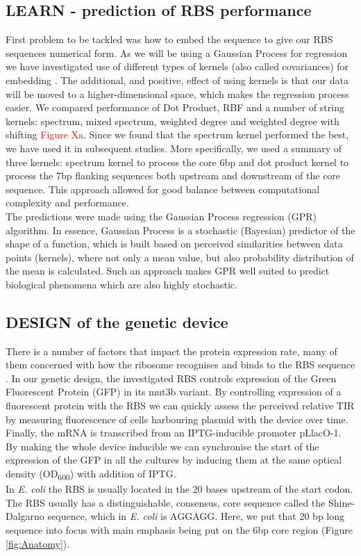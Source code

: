 \documentclass{article}
\begin{document}
\subsection{LEARN - prediction of RBS performance}
First problem to be tackled was how to embed the sequence to give our RBS sequences numerical form. As we will be using a Gaussian Process for regression we have investigated use of different types of kernels (also called covariances) for embedding \cite{Ben-Hur2008}. 
The additional, and positive, effect of using kernels is that our data will be moved to a higher-dimensional space, which makes the regression process easier. 
We compared performance of Dot Product, RBF and a number of string kernels: spectrum, mixed spectrum, weighted degree and weighted degree with shifting \textcolor{red}{Figure Xa}. 
Since we found that the spectrum kernel performed the best, we have used it in subsequent studies. More specifically, we used a summary of three kernels: spectrum kernel to process the core 6bp and dot product kernel to process the 7bp flanking sequences both upstream and downstream of the core sequence. This approach allowed for good balance between computational complexity and performance.\\
The predictions were made using the Gaussian Process regression (GPR) algorithm. 
In essence, Gaussian Process is a stochastic (Bayesian) predictor of the shape of a function, which is built based on perceived similarities between data points (kernels), where not only a mean value, but also probability distribution of the mean is calculated. 
Such an approach makes GPR well suited to predict biological phenomena which are also highly stochastic. \\


\subsection{DESIGN of the genetic device}
There is a number of factors that impact the protein expression rate, many of them concerned with how the ribosome recognises and binds to the RBS sequence \cite{Chen1994,Vellanoweth1992,SHULTZABERGER2001}.
In our genetic design, the investigated RBS controls expression of the Green Fluorescent Protein (GFP) in its mut3b variant. 
By controlling expression of a fluorescent protein with the RBS we can quickly assess the perceived relative TIR by measuring fluorescence of cells harbouring plasmid with the device over time.
Finally, the mRNA is transcribed from an IPTG-inducible promoter pLlacO-1. 
By making the whole device inducible we can synchronise the start of the expression of the GFP in all the cultures by inducing them at the same optical density (OD\textsubscript{600}) with addition of IPTG.\\
In \emph{E. coli} the RBS is usually located in the 20 bases upstream of the start codon. 
The RBS usually has a distinguishable, consensus, core sequence called the Shine-Dalgarno sequence, which in \emph{E. coli} is AGGAGG. 
Here, we put that 20 bp long sequence into focus with main emphasis being put on the 6bp core region (Figure \ref{fig:Anatomy}).\\
\end{document}
